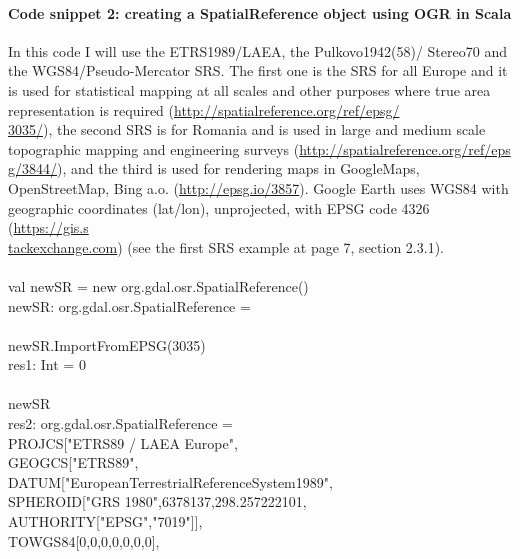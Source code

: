 \documentclass {article}
\begin{document}
\paragraph {Code snippet 2: creating a SpatialReference object using OGR in Scala}
In this code I will use the ETRS1989/LAEA, the Pulkovo1942(58)/ Stereo70 and the WGS84/Pseudo-Mercator SRS. The first one is the SRS for all Europe and it is used for statistical mapping at all scales and other purposes where true area representation is required (\href{http://spatialreference.org/ref/epsg/3035/}{http://spatialreference.org/ref/epsg/\\3035/}), the second SRS is for Romania and is used in large and medium scale topographic mapping and engineering surveys (\href{http://spatialreference.org/ref/epsg/3844/}{http://spatialreference.org/ref/eps\\g/3844/}), and the third is used for rendering maps in GoogleMaps, OpenStreetMap, Bing a.o. (\href{http://epsg.io/3857}{http://epsg.io/3857}). 
Google Earth uses WGS84 with geographic coordinates (lat/lon), unprojected, with EPSG code 4326 (\href{https://gis.stackexchange.com}{https://gis.s\\tackexchange.com}) (see the first SRS example at page 7, section 2.3.1). 
\\
\\
val newSR = new org.gdal.osr.SpatialReference()\\
newSR: org.gdal.osr.SpatialReference = \\
\\
newSR.ImportFromEPSG(3035) \\
res1: Int = 0 \\
\\
newSR \\
res2: org.gdal.osr.SpatialReference = \\
PROJCS["ETRS89 / LAEA Europe",\\
\hspace*{2mm} GEOGCS["ETRS89",\\
\hspace*{4mm} DATUM["European\underline{\space}Terrestrial\underline{\space}Reference\underline{\space}System\underline{\space}1989",\\
\hspace*{6mm} SPHEROID["GRS 1980",6378137,298.257222101,\\
\hspace*{8mm} AUTHORITY["EPSG","7019"]],\\
\hspace*{6mm} TOWGS84[0,0,0,0,0,0,0],\\
\end{document}
